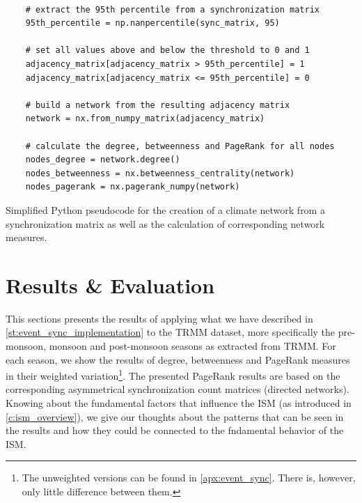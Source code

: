 \begin{listing}[h]
  \begin{verbatim}

    # extract the 95th percentile from a synchronization matrix
    95th_percentile = np.nanpercentile(sync_matrix, 95)

    # set all values above and below the threshold to 0 and 1
    adjacency_matrix[adjacency_matrix > 95th_percentile] = 1
    adjacency_matrix[adjacency_matrix <= 95th_percentile] = 0

    # build a network from the resulting adjacency matrix
    network = nx.from_numpy_matrix(adjacency_matrix)

    # calculate the degree, betweenness and PageRank for all nodes
    nodes_degree = network.degree()
    nodes_betweenness = nx.betweenness_centrality(network)
    nodes_pagerank = nx.pagerank_numpy(network)

  \end{verbatim}
  \caption{Simplified Python pseudocode for the creation of a climate network from a synchronization matrix as well as the calculation of corresponding network measures.}
  \label{lst:climate_networks}
\end{listing}

\clearpage
\section{Results \& Evaluation}
\label{st:event_sync_results}
This sections presents the results of applying what we have described in \cref{st:event_sync_implementation} to the TRMM dataset, more specifically the pre-monsoon, monsoon and post-monsoon seasons as extracted from TRMM. For each season, we show the results of degree, betweenness and PageRank measures in their weighted variation\footnote{The unweighted versions can be found in \cref{apx:event_sync}. There is, however, only little difference between them.}. The presented PageRank results are based on the corresponding asymmetrical synchronization count matrices (directed networks). Knowing about the fundamental factors that influence the ISM (as introduced in \cref{c:ism_overview}), we give our thoughts about the patterns that can be seen in the results and how they could be connected to the fndamental behavior of the ISM.

